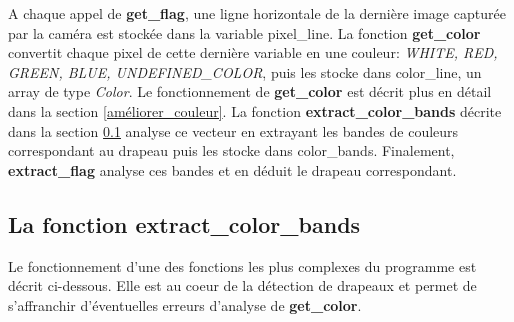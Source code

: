\documentclass{article}
\begin{document}
    A chaque appel de \textbf{get\_flag}, une ligne horizontale de la dernière image capturée par la caméra est stockée dans la variable \textcolor{bleu}{pixel\_line}. 
    La fonction \textbf{get\_color} convertit chaque pixel de cette dernière variable en une couleur: \textit{WHITE, RED, GREEN, BLUE, UNDEFINED\_COLOR}, puis les stocke dans \textcolor{bleu}{color\_line}, un array de type \textit{Color}. 
    Le fonctionnement de \textbf{get\_color} est décrit plus en détail dans la section \ref{améliorer_couleur}. 
    La fonction \textbf{extract\_color\_bands} décrite dans la section \ref{extract_color_bands} analyse ce vecteur en extrayant les bandes de couleurs correspondant au drapeau puis les stocke dans \textcolor{bleu}{color\_bands}. 
    Finalement, \textbf{extract\_flag} analyse ces bandes et en déduit le drapeau correspondant.
    
    \subsection{La fonction extract\_color\_bands}
    \label{extract_color_bands}
    
    Le fonctionnement d'une des fonctions les plus complexes du programme est décrit ci-dessous. Elle est au coeur de la détection de drapeaux et permet de s'affranchir d'éventuelles erreurs d'analyse de \textbf{get\_color}.
    
\end{document}
